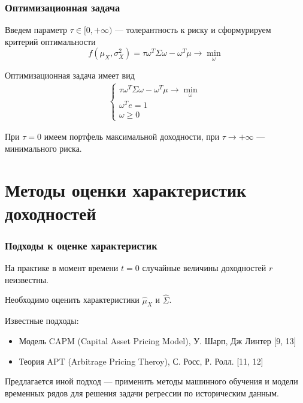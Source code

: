 \documentclass{beamer}
\begin{document}
\begin{frame}
    \frametitle{Оптимизационная задача}
    Введем параметр $\tau \in [0, +\infty)$ --- толерантность к риску и сформурируем критерий оптимальности
    \[ 
        f(\mu_X, \sigma_X^2) = \tau \omega^T \Sigma \omega - \omega^T \mu \rightarrow \min_{\omega}
    \]

    Оптимизационная задача имеет вид
    \begin{align*}
        \begin{cases}
            \tau \omega^T \Sigma \omega - \omega^T \mu \rightarrow \min_{\omega} \\
            \omega^T e = 1 \\
            \omega \ge 0
        \end{cases}
    \end{align*}

    При $\tau=0$ имеем портфель максимальной доходности, при $\tau \rightarrow +\infty$
    --- минимального риска.
\end{frame}




\section{Методы оценки характеристик доходностей}

\begin{frame}
    \frametitle{Подходы к оценке характеристик}

    На практике в момент времени $t=0$ случайные величины доходностей $r$ неизвестны.
    
    Необходимо оценить характеристики $\hat{\mu}_X$ и $\hat{\Sigma}$.

    Известные подходы:
    \begin{itemize}
        \item Модель CAPM (Capital Asset Pricing Model), У. Шарп, Дж Линтер [9, 13]
        \item Теория  APT (Arbitrage Pricing Theroy), С. Росс, Р. Ролл. [11, 12]
    \end{itemize}
    
    Предлагается иной подход --- применить методы машинного обучения и модели временных
    рядов для решения задачи регрессии по историческим данным.
\end{frame}
\end{document}
